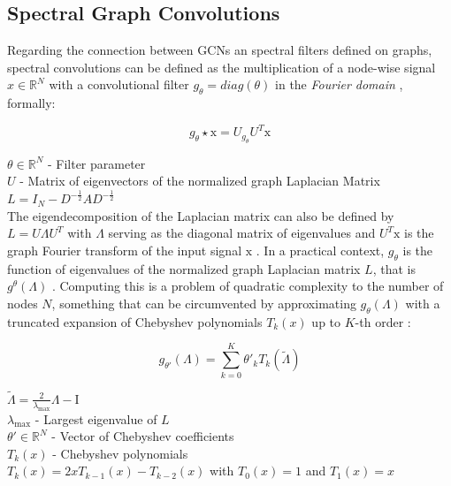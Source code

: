 \subsection*{Spectral Graph Convolutions}

Regarding the connection between GCNs an spectral filters defined on graphs, spectral convolutions can be defined as the multiplication of a node-wise signal $x \in \mathbb{R}^N$ with a convolutional filter $g_\theta = diag(\theta)$ in the \textit{Fourier domain} \cite{liuIntroductionGraphNeural2020, tangGraphNeuralNetworks2022}, formally:

\begin{equation}    
	g_\theta \star \text{x} = U_{g_\theta} U^T \text{x}
\end{equation}

$\theta \in \mathbb{R}^N$ - Filter parameter \\
$U$ - Matrix of eigenvectors of the normalized graph Laplacian Matrix $L = I_N - D^{-\frac{1}{2}} AD^{-\frac{1}{2}}$ \\

The eigendecomposition of the Laplacian matrix can also be defined by $L = U \Lambda U^T$ with $\Lambda$ serving as the diagonal matrix of eigenvalues and $U^T \text{x}$ is the graph Fourier transform of the input signal $\text{x}$ \cite{tangGraphNeuralNetworks2022}. In a practical context, $g_\theta$ is the function of eigenvalues of the normalized graph Laplacian matrix $L$, that is $g^\theta(\Lambda)$ \cite{liuIntroductionGraphNeural2020, tangGraphNeuralNetworks2022}. Computing this is a problem of quadratic complexity to the number of nodes $N$, something that can be circumvented by approximating $g_\theta (\Lambda)$ with a truncated expansion of Chebyshev polynomials $T_k(x)$ up to $K$-th order \cite{liuIntroductionGraphNeural2020, tangGraphNeuralNetworks2022}:

\begin{equation}
	g_{\theta'}(\Lambda) = \sum^K_{k=0} \theta'_k T_k(\tilde{\Lambda})    
\end{equation}

$\tilde{\Lambda} = \frac{2}{\lambda_\text{max}} \Lambda - \text{I}$  \\
$\lambda_\text{max}$ - Largest eigenvalue of $L$ \\
$\theta' \in \mathbb{R}^N$ - Vector of Chebyshev coefficients \\
$T_k(x)$ - Chebyshev polynomials \\
$T_k(x) = 2 x T_{k - 1} (x) - T_{k - 2}(x)$ with $T_0(x) = 1$ and $T_1(x) = x$ \\

